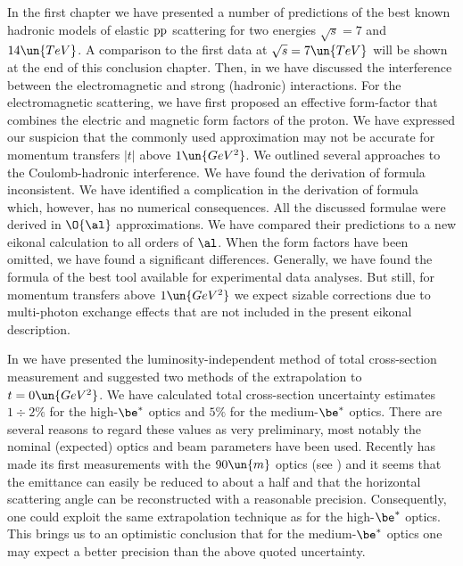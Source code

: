 \def\CaptionPrefix{C.}

In the first chapter we have presented a number of predictions of the best known hadronic models of elastic $\rm pp$ scattering for two  energies $\sqrt s = 7$ and $14\un{TeV}$. A comparison to the first  data at $\sqrt s = 7\un{TeV}$ will be shown at the end of this conclusion chapter. Then, in  we have discussed the interference between the electromagnetic and strong (hadronic) interactions. For the electromagnetic scattering, we have first proposed an effective form-factor that combines the electric and magnetic form factors of the proton. We have expressed our suspicion that the commonly used  approximation may not be accurate for momentum transfers $|t|$ above $1\un{GeV^2}$. We outlined several approaches to the Coulomb-hadronic interference. We have found the derivation of \WaY{} formula inconsistent. We have identified a complication in the derivation of \KaL{} formula which, however, has no numerical consequences. All the discussed formulae were derived in $\O{\al}$ approximations. We have compared their predictions to a new eikonal calculation to all orders of $\al$. When the form factors have been omitted, we have found a significant differences. Generally, we have found the formula of \KaL{} the best tool available for experimental data analyses. But still, for momentum transfers above $1\un{GeV^2}$ we expect sizable corrections due to multi-photon exchange effects that are not included in the present eikonal description.

In  we have presented the luminosity-independent method of total cross-section measurement and suggested two methods of the extrapolation to $t=0\un{GeV^2}$. We have calculated total cross-section uncertainty estimates $1\div2\percent$ for the high-$\be^*$ optics and $5\percent$ for the medium-$\be^*$ optics. There are several reasons to regard these values as very preliminary, most notably the nominal (expected) optics and beam parameters have been used. Recently  has made its first measurements with the $90\un{m}$ optics (see ) and it seems that the emittance can easily be reduced to about a half and that the horizontal scattering angle can be reconstructed with a reasonable precision. Consequently, one could exploit the same extrapolation technique as for the high-$\be^*$ optics. This brings us to an optimistic conclusion that for the medium-$\be^*$ optics one may expect a better precision than the above quoted uncertainty.

